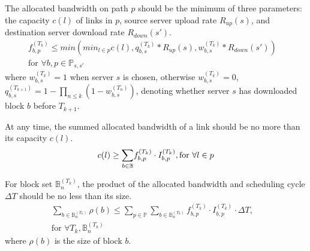 \begin{packeditemize}

\item The allocated bandwidth on path $p$ should be the minimum of three parameters: the capacity $c(l)$ of links in $p$, source server upload rate $R_{up}(s)$, and destination server download rate $R_{down}(s')$.%
\begin{equation}
\begin{split}
f^{(T_k)}_{b,p} \leq min\left(min_{l\in p} c(l), q_{b,s}^{(T_k)}*R_{up}(s), w_{b,s}^{(T_k)}*R_{down}(s')\right) &\\
\text{for }\forall b, p\in \mathbb{P}_{s,s'} &%
\end{split}
\end{equation}
where $w_{b,s}^{(T_k)}=1$ when server $s$ is chosen, otherwise $w_{b,s}^{(T_k)}=0$, $q_{b,s}^{(T_{k+1})} = 1-\prod_{n\leq k} (1-w_{b,s}^{(T_n)})$, denoting whether server $s$ has downloaded block $b$ before $T_{k+1}$.

\item At any time, the summed allocated bandwidth of a link should be no more than its capacity $c(l)$.
\begin{equation}
c(l) \geq \displaystyle{\sum_{b \in \mathbb{B}}} f^{(T_k)}_{b,p} \cdot I^{(T_k)}_{b,p}, \text{for }\forall l\in p\\
\end{equation}

\item For block set $\mathbb{B}^{(T_k)}_n$, the product of the allocated bandwidth and scheduling cycle $\Delta T$ should be no less than its size.%
\begin{equation}
\begin{split}
\displaystyle{\sum_{b\in \mathbb{B}^{(T_k)}_n}} \rho(b) \leq \displaystyle{\sum_{p\in \mathbb{P}}} \displaystyle{\sum_{b \in \mathbb{B}^{(T_k)}_n}} f^{(T_k)}_{b,p} \cdot I^{(T_k)}_{b,p} \cdot \Delta T,& \\
\text{for }\forall T_k, \mathbb{B}^{(T_k)}_n &
\end{split}
\end{equation}
where $\rho(b)$ is the size of block $b$.



\end{packeditemize}
